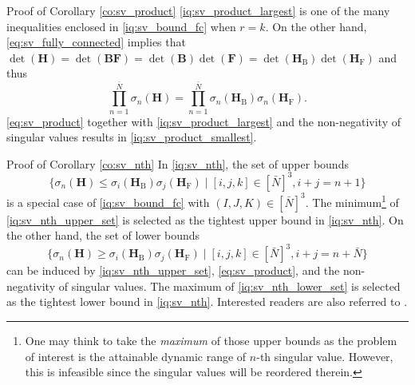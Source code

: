 \documentclass[journal]{IEEEtran}
\begin{document}
\begin{appendix}
	\begin{subsection}{Proof of Corollary \ref{co:sv_product}}\label{ap:sv_product}
		\eqref{iq:sv_product_largest} is one of the many inequalities enclosed in \eqref{iq:sv_bound_fc} when $r = k$.
			On the other hand, \ref{eq:sv_fully_connected} implies that
			$\det(\mathbf{H}) = \det(\mathbf{B}\mathbf{F}) = \det(\mathbf{B})\det(\mathbf{F}) = \det(\mathbf{H}_\mathrm{B})\det(\mathbf{H}_\mathrm{F})$ and thus
			\begin{equation}
				\prod_{n=1}^{\bar{N}} \sigma_n(\mathbf{H}) = \prod_{n=1}^{\bar{N}} \sigma_n(\mathbf{H}_\mathrm{B}) \sigma_n(\mathbf{H}_\mathrm{F}).
				\label{eq:sv_product}
			\end{equation}
			\eqref{eq:sv_product} together with \eqref{iq:sv_product_largest} and the non-negativity of singular values results in \eqref{iq:sv_product_smallest}.
	\end{subsection}

	\begin{subsection}{Proof of Corollary \ref{co:sv_nth}}\label{ap:sv_nth}
		In \eqref{iq:sv_nth}, the set of upper bounds
		\begin{equation}
			\bigl\{\sigma_n(\mathbf{H}) \le \sigma_i(\mathbf{H}_\mathrm{B}) \sigma_j(\mathbf{H}_\mathrm{F}) \mid [i,j,k] \in [\bar{N}]^3, i+j=n+1\bigr\}
			\label{iq:sv_nth_upper_set}
		\end{equation}
		is a special case of \eqref{iq:sv_bound_fc} with $(I, J, K) \in [\bar{N}]^3$.
		The minimum\footnote{One may think to take the \emph{maximum} of those upper bounds as the problem of interest is the attainable dynamic range of $n$-th singular value. However, this is infeasible since the singular values will be reordered therein.} of \eqref{iq:sv_nth_upper_set} is selected as the tightest upper bound in \eqref{iq:sv_nth}.
		On the other hand, the set of lower bounds
		\begin{equation}
			\bigl\{\sigma_n(\mathbf{H}) \ge \sigma_i(\mathbf{H}_\mathrm{B}) \sigma_j(\mathbf{H}_\mathrm{F}) \mid [i,j,k] \in [\bar{N}]^3, i+j=n+\bar{N}\bigr\}
			\label{iq:sv_nth_lower_set}
		\end{equation}
		can be induced by \eqref{iq:sv_nth_upper_set}, \eqref{eq:sv_product}, and the non-negativity of singular values.
		The maximum of \eqref{iq:sv_nth_lower_set} is selected as the tightest lower bound in \eqref{iq:sv_nth}.
		Interested readers are also referred to \cite[Equation~2.0.3]{Zhang2005}.


\end{subsection}
\end{appendix}
\end{document}
